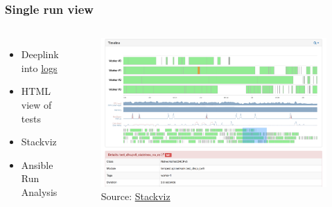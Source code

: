 \documentclass[aspectratio=169,11pt,hyperref={colorlinks=true}]{beamer}
\begin{document}
\begin{frame}
    \frametitle{Single run view}
    \begin{columns}
        \begin{itemize}
            \item{Deeplink into \href{http://logs.openstack.org/22/466822/1/gate/gate-tempest-dsvm-neutron-full-ubuntu-xenial/d6f19c0/logs/}{logs}}
            \item{HTML view of tests}
            \item{Stackviz}
            \item{Ansible Run Analysis}
        \end{itemize}
            \begin{figure}
                \includegraphics[width=1\textwidth]{stackviz.png}
                \caption{Source: \href{http://logs.openstack.org/22/466822/1/gate/gate-tempest-dsvm-neutron-full-ubuntu-xenial/d6f19c0/logs/stackviz/\#/stdin/timeline?test=tempest.api.network.test_dhcp_ipv6.NetworksTestDHCPv6.test_dhcpv6_stateless_no_ra}{Stackviz}}
            \end{figure}
    \end{columns}
\end{frame}

\end{document}

